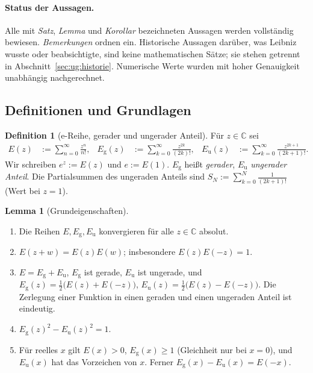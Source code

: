 \documentclass[a4paper,12pt,twoside]{report}
\theoremstyle{definition}
\newtheorem{definition}{Definition}
\newtheorem{lemma}{Lemma}
\begin{document}
\paragraph{Status der Aussagen.}
Alle mit \emph{Satz}, \emph{Lemma} und \emph{Korollar} bezeichneten Aussagen werden vollständig bewiesen. \emph{Bemerkungen} ordnen ein. Historische Aussagen darüber, was Leibniz wusste oder beabsichtigte, sind keine mathematischen Sätze; sie stehen getrennt in Abschnitt~\ref{sec:ug:historie}. Numerische Werte wurden mit hoher Genauigkeit unabhängig nachgerechnet.

\subsection{Definitionen und Grundlagen}
\label{sec:ug:grund}

\begin{definition}[e-Reihe, gerader und ungerader Anteil]\label{def:ug:anteile}
Für $z\in\mathbb{C}$ sei
\begin{align}
E(z)&:=\sum_{n=0}^{\infty}\frac{z^n}{n!}, &
E_{\mathrm g}(z)&:=\sum_{k=0}^{\infty}\frac{z^{2k}}{(2k)!}, &
E_{\mathrm u}(z)&:=\sum_{k=0}^{\infty}\frac{z^{2k+1}}{(2k+1)!}.
\end{align}
Wir schreiben $e^z:=E(z)$ und $e:=E(1)$. $E_{\mathrm g}$ heißt \emph{gerader}, $E_{\mathrm u}$ \emph{ungerader Anteil}. Die Partialsummen des ungeraden Anteils sind $S_N:=\sum_{k=0}^{N}\frac{1}{(2k+1)!}$ (Wert bei $z=1$).
\end{definition}

\begin{lemma}[Grundeigenschaften]\label{lem:ug:grund}
\begin{enumerate}[label=(\alph*)]
\item Die Reihen $E,E_{\mathrm g},E_{\mathrm u}$ konvergieren für alle $z\in\mathbb{C}$ absolut.
\item $E(z+w)=E(z)E(w)$; insbesondere $E(z)E(-z)=1$.
\item $E=E_{\mathrm g}+E_{\mathrm u}$, $E_{\mathrm g}$ ist gerade, $E_{\mathrm u}$ ist ungerade, und
$E_{\mathrm g}(z)=\tfrac12\big(E(z)+E(-z)\big)$, $E_{\mathrm u}(z)=\tfrac12\big(E(z)-E(-z)\big)$.
Die Zerlegung einer Funktion in einen geraden und einen ungeraden Anteil ist eindeutig.
\item $E_{\mathrm g}(z)^2-E_{\mathrm u}(z)^2=1$.
\item Für reelles $x$ gilt $E(x)>0$, $E_{\mathrm g}(x)\ge 1$ (Gleichheit nur bei $x=0$), und $E_{\mathrm u}(x)$ hat das Vorzeichen von $x$. Ferner $E_{\mathrm g}(x)-E_{\mathrm u}(x)=E(-x)$.
\end{enumerate}
\end{lemma}
\end{document}
